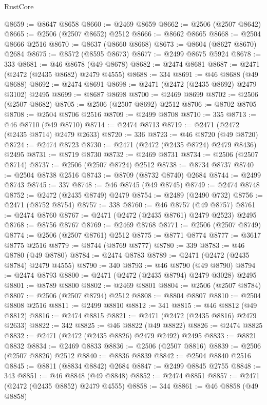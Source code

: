 \begin{lexlean}{RustCore}
\begin{coremodule}
@8659 := @8647 @8658
@8660 := @2469 @8659
@8662 := @2506 (@2507 @8642)
@8665 := @2506 (@2507 @8652) @2512
@8666 := @8662 @8665
@8668 := @2504 @8666 @2516
@8670 := @8637 (@8660 @8668)
@8673 := @8604 (@8627 @8670) @2684
@8675 := @8572 (@8595 @8673)
@8677 := @2499 @8675 @5924
@8678 := 333
@8681 := @46 @8678 (@49 @8678)
@8682 := @2474 @8681
@8687 := @2471 (@2472 (@2435 @8682) @2479 @4555)
@8688 := 334
@8691 := @46 @8688 (@49 @8688)
@8692 := @2474 @8691
@8698 := @2471 (@2472 (@2435 @8692) @2479 @3102) @2495
@8699 := @8687 @8698
@8700 := @2469 @8699
@8702 := @2506 (@2507 @8682)
@8705 := @2506 (@2507 @8692) @2512
@8706 := @8702 @8705
@8708 := @2504 @8706 @2516
@8709 := @2499 @8708
@8710 := 335
@8713 := @46 @8710 (@49 @8710)
@8714 := @2474 @8713
@8719 := @2471 (@2472 (@2435 @8714) @2479 @2633)
@8720 := 336
@8723 := @46 @8720 (@49 @8720)
@8724 := @2474 @8723
@8730 := @2471 (@2472 (@2435 @8724) @2479 @8436) @2495
@8731 := @8719 @8730
@8732 := @2469 @8731
@8734 := @2506 (@2507 @8714)
@8737 := @2506 (@2507 @8724) @2512
@8738 := @8734 @8737
@8740 := @2504 @8738 @2516
@8743 := @8709 (@8732 @8740) @2684
@8744 := @2499 @8743
@8745 := 337
@8748 := @46 @8745 (@49 @8745)
@8749 := @2474 @8748
@8752 := @2472 (@2435 @8749) @2479
@8754 := @2489 (@2490 @732)
@8756 := @2471 (@8752 @8754)
@8757 := 338
@8760 := @46 @8757 (@49 @8757)
@8761 := @2474 @8760
@8767 := @2471 (@2472 (@2435 @8761) @2479 @2523) @2495
@8768 := @8756 @8767
@8769 := @2469 @8768
@8771 := @2506 (@2507 @8749)
@8774 := @2506 (@2507 @8761) @2512
@8775 := @8771 @8774
@8777 := @3617 @8775 @2516
@8779 := @8744 (@8769 @8777)
@8780 := 339
@8783 := @46 @8780 (@49 @8780)
@8784 := @2474 @8783
@8789 := @2471 (@2472 (@2435 @8784) @2479 @4555)
@8790 := 340
@8793 := @46 @8790 (@49 @8790)
@8794 := @2474 @8793
@8800 := @2471 (@2472 (@2435 @8794) @2479 @3028) @2495
@8801 := @8789 @8800
@8802 := @2469 @8801
@8804 := @2506 (@2507 @8784)
@8807 := @2506 (@2507 @8794) @2512
@8808 := @8804 @8807
@8810 := @2504 @8808 @2516
@8811 := @2499 @8810
@8812 := 341
@8815 := @46 @8812 (@49 @8812)
@8816 := @2474 @8815
@8821 := @2471 (@2472 (@2435 @8816) @2479 @2633)
@8822 := 342
@8825 := @46 @8822 (@49 @8822)
@8826 := @2474 @8825
@8832 := @2471 (@2472 (@2435 @8826) @2479 @2492) @2495
@8833 := @8821 @8832
@8834 := @2469 @8833
@8836 := @2506 (@2507 @8816)
@8839 := @2506 (@2507 @8826) @2512
@8840 := @8836 @8839
@8842 := @2504 @8840 @2516
@8845 := @8811 (@8834 @8842) @2684
@8847 := @2499 @8845 @2755
@8848 := 343
@8851 := @46 @8848 (@49 @8848)
@8852 := @2474 @8851
@8857 := @2471 (@2472 (@2435 @8852) @2479 @4555)
@8858 := 344
@8861 := @46 @8858 (@49 @8858)

\end{coremodule}
\end{lexlean}
